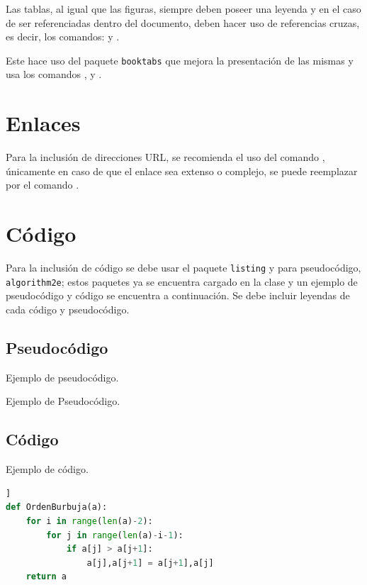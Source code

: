 \documentclass{aleph-revista}
\begin{document}
Las tablas, al igual que las figuras, siempre deben poseer una leyenda y en el caso de ser referenciadas dentro del documento, deben hacer uso de referencias cruzas, es decir, los comandos: \verb@{} y \verb@{}.


Este hace uso del paquete \texttt{booktabs} que mejora la presentación de las mismas y usa los comandos \verb@\toprule@, \verb@\midrule@ y \verb@\bottomrule@.

\section{Enlaces}

Para la inclusión de direcciones URL, se recomienda el uso del comando \verb@\url@, únicamente en caso de que el enlace sea extenso o complejo, se puede reemplazar por el comando \verb@\href@.

\section{Código}

Para la inclusión de código se debe usar el paquete \texttt{listing} y para pseudocódigo, \texttt{algorithm2e}; estos paquetes ya se encuentra cargado en la clase y un ejemplo de pseudocódigo y código se encuentra a continuación. Se debe incluir leyendas de cada código y pseudocódigo.

\subsection{Pseudocódigo} 

Ejemplo de pseudocódigo.

\begin{algorithm}[H]
\caption{Ejemplo de Pseudocódigo.}
\end{algorithm}

\subsection{Código}

Ejemplo de código.

\begin{lstlisting}[language=Python,caption={Ejemplo de código.},captionpos=b]]
def OrdenBurbuja(a):
    for i in range(len(a)-2):
        for j in range(len(a)-i-1):
            if a[j] > a[j+1]:
                a[j],a[j+1] = a[j+1],a[j]
    return a
\end{lstlisting}
\end{document}
